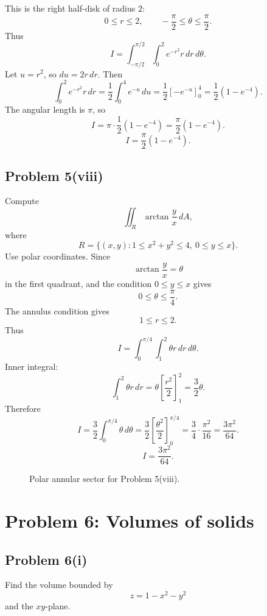\documentclass[11pt,a4paper]{article}
\begin{document}
This is the right half-disk of radius \(2\):
\[
 0\le r\le2,
\qquad -\frac\pi2\le\theta\le\frac\pi2.
\]
Thus
\[
 I=\int_{-\pi/2}^{\pi/2}\int_0^2e^{-r^2}r\,dr\,d\theta.
\]
Let \(u=r^2\), so \(du=2r\,dr\). Then
\[
 \int_0^2e^{-r^2}r\,dr
 =\frac12\int_0^4e^{-u}\,du
 =\frac12[-e^{-u}]_0^4
 =\frac12(1-e^{-4}).
\]
The angular length is \(\pi\), so
\[
 I=\pi\cdot\frac12(1-e^{-4})
 =\frac\pi2(1-e^{-4}).
\]
\[
\boxed{I=\frac\pi2(1-e^{-4}).}
\]

\subsection{Problem 5(viii)}
Compute
\[
 \iint_R\arctan\frac{y}{x}\,dA,
\]
where
\[
 R=\{(x,y):1\le x^2+y^2\le4,
\ 0\le y\le x\}.
\]
Use polar coordinates.  Since
\[
 \arctan\frac{y}{x}=\theta
\]
in the first quadrant, and the condition \(0\le y\le x\) gives
\[
 0\le\theta\le\frac\pi4.
\]
The annulus condition gives
\[
 1\le r\le2.
\]
Thus
\[
 I=\int_0^{\pi/4}\int_1^2 \theta r\,dr\,d\theta.
\]
Inner integral:
\[
 \int_1^2\theta r\,dr=\theta\left[\frac{r^2}{2}\right]_1^2=\frac32\theta.
\]
Therefore
\[
 I=\frac32\int_0^{\pi/4}\theta\,d\theta
 =\frac32\left[\frac{\theta^2}{2}\right]_0^{\pi/4}
 =\frac34\cdot\frac{\pi^2}{16}
 =\frac{3\pi^2}{64}.
\]
\[
\boxed{I=\frac{3\pi^2}{64}.}
\]

\begin{figure}[H]
\centering
{}
\caption{Polar annular sector for Problem 5(viii).}
\end{figure}

\section{Problem 6: Volumes of solids}

\subsection{Problem 6(i)}
Find the volume bounded by
\[
 z=1-x^2-y^2
\]
and the \(xy\)-plane.
\end{document}
